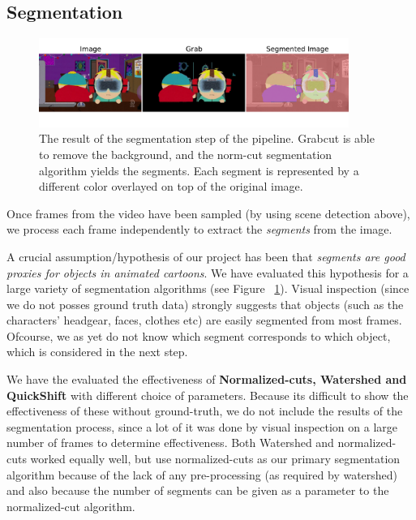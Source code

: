 \documentclass[10pt,twocolumn,letterpaper]{article}
\begin{document}
\subsection{Segmentation}
\begin{figure}[ht]
  \centering
  \includegraphics[width=0.9\textwidth]{../seg2.pdf}
  \caption{The result of the segmentation step of the
    pipeline. Grabcut is able to remove the background, and the
    norm-cut segmentation algorithm yields the segments. Each segment
    is represented by a different color overlayed on top of the
    original image. }
  \label{diff-segmentations}
\end{figure}

Once frames from the video have been sampled (by using scene detection
above), we process each frame independently to extract the
\emph{segments} from the image. 

A crucial assumption/hypothesis of our project has been that
\emph{segments are good proxies for objects in animated cartoons}.  We
have evaluated this hypothesis for a large variety of segmentation
algorithms (see Figure ~\ref{diff-segmentations}). Visual inspection
(since we do not posses ground truth data) strongly suggests that
objects (such as the characters' headgear, faces, clothes etc) are
easily segmented from most frames. Ofcourse, we as yet do not know
which segment corresponds to which object, which is considered in the
next step. 


We have the evaluated the effectiveness of \textbf{Normalized-cuts, Watershed
and QuickShift} with different choice of parameters. Because its
difficult to show the effectiveness of these without ground-truth, we
do not include the results of the segmentation process, since a lot of
it was done by visual inspection on a large number of frames to
determine effectiveness.  Both Watershed and normalized-cuts worked
equally well, but use normalized-cuts as our primary segmentation
algorithm because of the lack of any pre-processing (as required by
watershed) and also because the number of segments can be given as a
parameter to the normalized-cut algorithm. 
\end{document}
